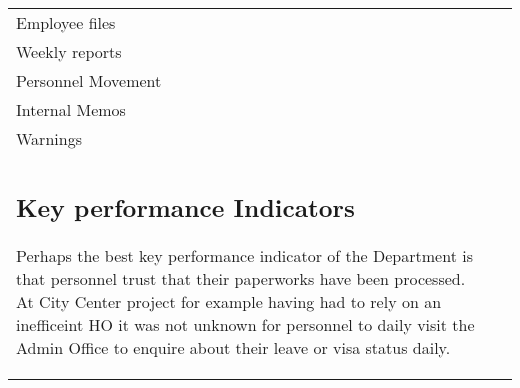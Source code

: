 \begin{tabular}{ll}
Employee files &\\
Weekly reports &\\
Personnel Movement &\\
Internal Memos &\\
Warnings &\\

\subsection*{Key performance Indicators}

Perhaps the best key performance indicator of the Department is that personnel trust that their paperworks have been processed. At City Center project for example having had to rely on an inefficeint HO it was not unknown for personnel to daily visit the Admin Office to enquire about their leave or visa status daily. 

\end{tabular}






















